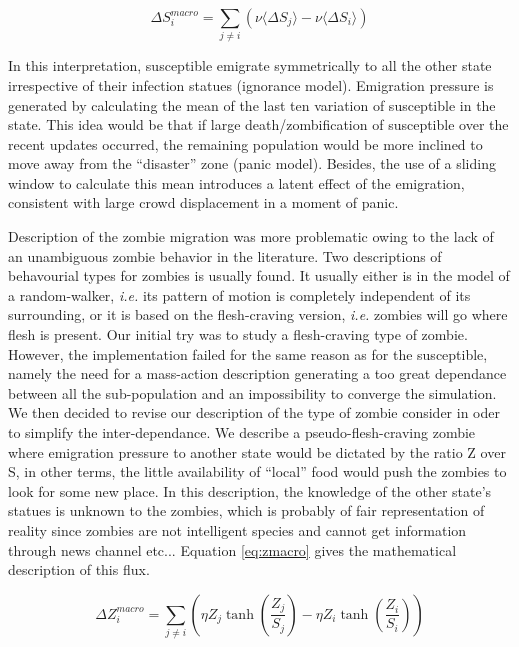 \documentclass[11pt]{article} %
\begin{document}
\begin{equation} \label{eq:smacro}
\Delta S_{i}^{macro} =  \sum_{j\neq i}{ \left( \nu \langle \Delta S_{j} \rangle - \nu  \langle \Delta S_{i} \rangle \right) }
\end{equation}


In this interpretation, susceptible emigrate symmetrically to all the other state irrespective of their infection statues (ignorance model). Emigration pressure is generated by calculating the mean of the last ten variation of susceptible in the state. This idea would be that if large death/zombification of susceptible over the recent updates occurred, the remaining population would be more inclined to move away from the ``disaster'' zone (panic model). Besides, the use of a sliding window to calculate this mean introduces a latent effect of the emigration, consistent with large crowd displacement in a moment of panic. 

Description of the zombie migration was more problematic owing to the lack of an unambiguous zombie behavior in the literature. Two descriptions of behavourial types for zombies is usually found. It usually either is in the model of a random-walker, \textit{i.e.} its pattern of motion is completely independent of its surrounding, or it is based on the flesh-craving version, \textit{i.e.} zombies will go where flesh is present. Our initial try was to study a flesh-craving type of zombie. However, the implementation failed for the same reason as for the susceptible, namely the need for a mass-action description generating a too great dependance between all the sub-population and an impossibility to converge the simulation. We then decided to revise our description of the type of zombie consider in oder to simplify the inter-dependance. We describe a pseudo-flesh-craving zombie where emigration pressure to another state would be dictated by the ratio Z over S, in other terms, the little availability of ``local'' food would push the zombies to look for some new place. In this description, the knowledge of the other state's statues is unknown to the zombies, which is probably of fair representation of reality since zombies are not intelligent species and cannot get information through news channel etc... Equation \eqref{eq:zmacro} gives the mathematical description of this flux. 

\begin{equation} \label{eq:zmacro}
\Delta Z_{i}^{macro} = \sum_{j\neq i}{\left( \eta Z_{j}\tanh \left( \frac{Z_{j}}{S_{j}}\right) -\eta Z_{i}\tanh \left( \frac{Z_{i}}{S_{i}}\right) \right)}
\end{equation}
\end{document}
